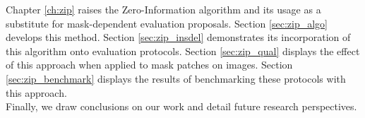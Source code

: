 \noindent Chapter \ref{ch:zip} raises the Zero-Information algorithm and its usage as a substitute
for mask-dependent evaluation proposals. Section \ref{sec:zip_algo} develops this 
method. Section \ref{sec:zip_insdel} demonstrates its incorporation of this 
algorithm onto evaluation protocols. Section \ref{sec:zip_qual} displays
the effect of this approach when applied to mask patches on images. Section 
\ref{sec:zip_benchmark} displays the results of benchmarking these protocols 
with this approach. \\
    
\noindent Finally, we draw conclusions on our work and detail future research perspectives.



